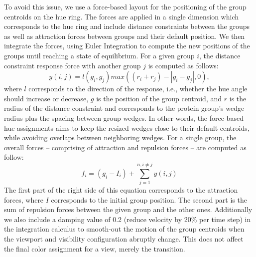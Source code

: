 \documentclass{egpubl}
\begin{document}
	To avoid this issue, we use a force-based layout for the positioning of the group centroids on the hue ring.
	The forces are applied in a single dimension which corresponds to the hue ring and include distance constraints between the groups as well as attraction forces between groups and their default position.
	We then integrate the forces, using Euler Integration to compute the new positions of the groups until reaching a state of equilibrium.
	For a given group $i$, the distance constraint response force with another group $j$ is computed as follows:
	\begin{equation}%
	y(i, j) = l(g_{i},g_{j})max((r_{i}+r_{j}) - |g_{i} - g_{j}|, 0), 
	\end{equation}%
	where $l$ corresponds to the direction of the response, i.e., whether the hue angle should increase or decrease, $g$ is the position of the group centroid, and $r$ is the radius of the distance constraint and corresponds to the protein group's wedge radius plus the spacing between group wedges. 
	In other words, the force-based hue assignments aims to keep the resized wedges close to their default centroids, while avoiding overlaps between neighboring wedges.  
	For a single group, the overall forces -- comprising of attraction and repulsion forces -- are computed as follow:
	\begin{equation}
	f_{i} = (g_{i} - I_{i}) + \sum_{j=1}^{n, i \neq j} y(i,j)
	\end{equation}
	The first part of the right side of this equation corresponds to the attraction forces, where $I$ corresponds to the initial group position.
	The second part is the sum of repulsion forces between the given group and the other ones.
    Additionally we also include a damping value of 0.2 (reduce velocity by 20\% per time step) in the integration calculus to smooth-out the motion of the group centroids when the viewport and visibility configuration abruptly change. This does not affect the final color assignment for a view, merely the transition.
	
\end{document}
